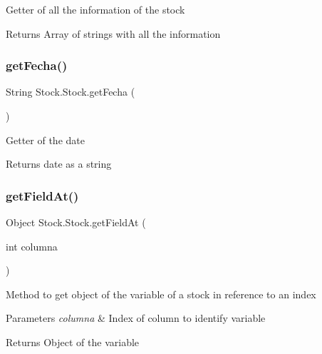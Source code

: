 Getter of all the information of the stock

\begin{DoxyReturn}{Returns}
Array of strings with all the information 
\end{DoxyReturn}
\mbox{\label{class_stock_1_1_stock_a4f9b096fbfa184bb56e35fe5b2dd2cac}} 
\subsubsection{\texorpdfstring{get\+Fecha()}{getFecha()}}
{\footnotesize\ttfamily String Stock.\+Stock.\+get\+Fecha (\begin{DoxyParamCaption}{ }\end{DoxyParamCaption})\hspace{0.3cm}{\ttfamily [inline]}}

Getter of the date

\begin{DoxyReturn}{Returns}
date as a string 
\end{DoxyReturn}
\mbox{\label{class_stock_1_1_stock_a7fbba145dd4040cc394bb0d903e43787}} 
\subsubsection{\texorpdfstring{get\+Field\+At()}{getFieldAt()}}
{\footnotesize\ttfamily Object Stock.\+Stock.\+get\+Field\+At (\begin{DoxyParamCaption}\item[{int}]{columna }\end{DoxyParamCaption})\hspace{0.3cm}{\ttfamily [inline]}}

Method to get object of the variable of a stock in reference to an index


\begin{DoxyParams}{Parameters}
{\em columna} & Index of column to identify variable \\
\hline
\end{DoxyParams}
\begin{DoxyReturn}{Returns}
Object of the variable 
\end{DoxyReturn}
\mbox{\label{class_stock_1_1_stock_a8e00c1574f810330efb7c84ff971be09}} 

